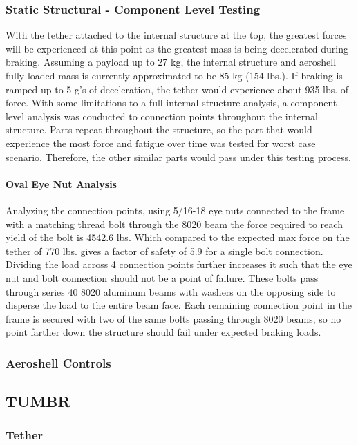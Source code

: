 \subsubsection*{Static Structural - Component Level Testing}
\indent\indent With the tether attached to the internal structure at the top, the greatest forces will be experienced at this point as the greatest mass is being decelerated during braking. Assuming a payload up to 27 kg, the internal structure and aeroshell fully loaded mass is currently approximated to be 85 kg (154 lbs.). If braking is ramped up to 5 g’s of deceleration, the tether would experience about 935 lbs. of force. With some limitations to a full internal structure analysis, a component level analysis was conducted to connection points throughout the internal structure. Parts repeat throughout the structure, so the part that would experience the most force and fatigue over time was tested for worst case scenario. Therefore, the other similar parts would pass under this testing process.

\paragraph{Oval Eye Nut Analysis} Analyzing the connection points, using 5/16-18 eye nuts connected to the frame with a matching thread bolt through the 8020 beam the force required to reach yield of the bolt is 4542.6 lbs. Which compared to the expected max force on the tether of 770 lbs. gives a factor of safety of 5.9 for a single bolt connection. Dividing the load across 4 connection points further increases it such that the eye nut and bolt connection should not be a point of failure. These bolts pass through series 40 8020 aluminum beams with washers on the opposing side to disperse the load to the entire beam face. Each remaining connection point in the frame is secured with two of the same bolts passing through 8020 beams, so no point farther down the structure should fail under expected braking loads.

\subsubsection{Aeroshell Controls}

\subsection{TUMBR}

\subsubsection{Tether}

